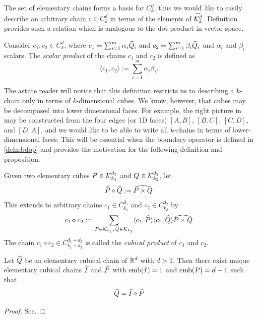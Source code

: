 The set of elementary chains forms a basis for $C_k^d$, thus we would like to easily describe an arbitrary chain $c \in C_k^d$ in terms of the elements of $\widehat{\mathcal{K}^{d}_k}$. Definition  provides such a relation which is analogous to the dot product in vector space.

\begin{defn} \label{defn:chainprod}
	Consider $c_1, c_2 \in C_k^d$, where $c_1 = \sum_{i=1}^m \alpha_i \widehat{Q}_i $ and $ c_2 = \sum_{i=1}^m \beta_i \widehat{Q}_i $ and $\alpha_i$ and $\beta_i$ scalars. The \textit{scalar product} of the chains $c_1$ and $c_2$ is defined as
	$$ \langle c_1, c_2 \rangle := \sum_{i=1}^m \alpha_i \beta_i . $$
\end{defn}

The astute reader will notice that this definition restricts us to describing a $k$-chain only in terms of $k$-dimensional cubes. We know, however, that cubes may be decomposed into lower dimensional faces. For example, the right picture in  may be constructed from the four edges (or 1D faces) $[A,B]$, $[B,C]$, $[C,D]$, and $[D,A]$, and we would like to be able to write all $k$-chains in terms of lower-dimensional faces. This will be essential when the boundary operator is defined in \ref{defn:bdop} and provides the motivation for the following definition and proposition.

\begin{defn}
	Given two elementary cubes $P \in \mathcal{K}_{k_1}^{d_1} $ and $ Q \in \mathcal{K}_{k_2}^{d_2} $, let
	$$ \widehat{P} \diamond \widehat{Q} := \widehat{ P \times Q } $$
	This extends to arbitrary chains $ c_1 \in C_{k_1}^{d_1} $ and $ c_2 \in C_{k_2}^{d_2} $ by
	$$ c_1 \diamond c_2 := \sum_{P \in \mathcal{K}_{k_1}, \, Q \in \mathcal{K}_{k_2} } \langle c_1, \widehat{P} \rangle \langle c_2, \widehat{Q} \rangle \widehat{ P \times Q} $$
	The chain $ c_1 \diamond c_2 \in C_{k_1 + k_2}^{d_1 + d_2} $ is called the \textit{cubical product} of $c_1$ and $c_2$.
\end{defn}

\begin{prop} \label{prop:chainprod}
	Let $\widehat{Q}$ be an elementary cubical chain of $\mathbb{R}^d$ with $d > 1$. Then there exist unique elementary cubical chains $\widehat{I}$ and $\widehat{P}$ with $\mathord{\mathrm{emb}(I)} = 1$ and $\mathord{\mathrm{emb}(P)} = d - 1$ such that
	$$ \widehat{Q} = \widehat{I} \diamond \widehat{P} $$
\end{prop}
%
\begin{proof}
	See.
\end{proof}

